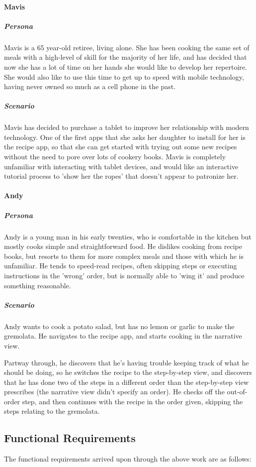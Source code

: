\paragraph{Mavis}
\subparagraph{Persona}
Mavis is a 65 year-old retiree, living alone. She has been cooking the same set 
of meals with a high-level of skill for the majority of her life, and has
decided that now she has a lot of time on her hands she would like to develop
her repertoire. She would also like to use this time to get up to speed with 
mobile technology, having never owned so much as a cell phone in the past.
\subparagraph{Scenario}
Mavis has decided to purchase a tablet to improve her relationship with modern
technology. One of the first apps that she asks her daughter to install for her
is the recipe app, so that she can get started with trying out some new recipes
without the need to pore over lots of cookery books. Mavis is completely 
unfamiliar with interacting with tablet devices, and would like an interactive 
tutorial process to 'show her the ropes' that doesn't appear to patronize her.

\paragraph{Andy}
\subparagraph{Persona}
Andy is a young man in his early twenties, who is comfortable in the kitchen but
mostly cooks simple and straightforward food. He dislikes cooking from recipe
books, but resorts to them for more complex meals and those with which he is
unfamiliar. He tends to speed-read recipes, often skipping steps or executing
instructions in the 'wrong' order, but is normally able to 'wing it' and produce
something reasonable.
\subparagraph{Scenario}
Andy wants to cook a potato salad, but has no lemon or garlic to make the
gremolata. He navigates to the recipe app, and starts cooking in the narrative
view.

Partway through, he discovers that he's having trouble keeping track of what he
should be doing, so he switches the recipe to the step-by-step view, and
discovers that he has done two of the steps in a different order than the 
step-by-step view prescribes (the narrative view didn't specify an order). He
checks off the out-of-order step, and then continues with the recipe in the
order given, skipping the steps relating to the gremolata.

\subsection{Functional Requirements}
The functional requirements arrived upon through the above work are as follows:

